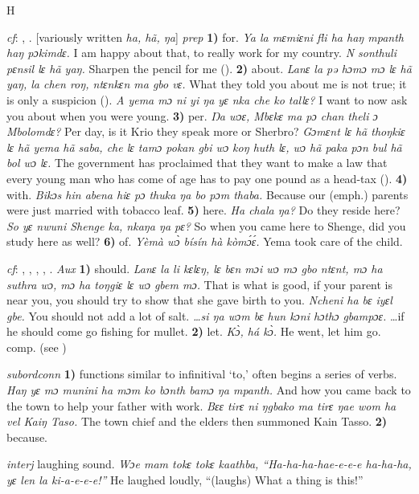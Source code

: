 \begin{letter}{H}

 \textit{cf}: , . [variously written \textit{ha, hã, ŋa}] \textit{prep} \textbf{1)} for. \textit{Ya la mɛmiɛni fli ha haŋ mpanth haŋ pɔkimdɛ.} I am happy about that, to really work for my country. \textit{N sonthuli pɛnsil lɛ hã yaŋ.} Sharpen the pencil for me (\citealt{Pichl1967}). \textbf{2)} about. \textit{Lanɛ la pə hɔmɔ mɔ lɛ hã yaŋ, la chen roŋ, ntɛnkɛn ma gbo vɛ.} What they told you about me is not true; it is only a suspicion (\citealt{Pichl1967}). \textit{A yema mɔ ni yi ŋa yɛ nka che ko tallɛ?} I want to now ask you about when you were young. \textbf{3)} per. \textit{Ŋa wɔɛ, Mbɛkɛ ma pɔ chan theli ɔ Mbolomdɛ?} Per day, is it Krio they speak more or Sherbro? \textit{Gɔmɛnt lɛ hã thoŋkiɛ lɛ hã yema hã saba, che lɛ tamɔ pokan gbi wɔ koŋ huth lɛ, wɔ hã paka pɔn bul hã bol wɔ lɛ.} The government has proclaimed that they want to make a law that every young man who has come of age has to pay one pound as a head-tax (\citealt{Pichl1967}). \textbf{4)} with. \textit{Bikɔs hin abena hiɛ pɔ thuka ŋa bo pɔm thaba.} Because our (emph.) parents were just married with tobacco leaf. \textbf{5)} here. \textit{Ha chala ŋa?} Do they reside here? \textit{So yɛ nwuni Shenge ka, nkaŋa ŋa pɛ?} So when you came here to Shenge, did you study here as well? \textbf{6)} of. \textit{Yèmà wɔ̀ bísín hà kòmɔ́ɛ́.} Yema took care of the child.

 \textit{cf}: , , , , . \textit{Aux} \textbf{1)} should. \textit{Lanɛ la li kɛlɛŋ, lɛ bɛn mɔi wɔ mɔ gbo ntɛnt, mɔ ha suthra wɔ, mɔ ha toŋgiɛ lɛ wɔ gbem mɔ.} That is what is good, if your parent is near you, you should try to show that she gave birth to you. \textit{Ncheni ha bɛ iyɛl gbe.} You should not add a lot of salt. \textit{…si ŋa wɔm bɛ hun kɔni hɔthɔ gbampɔɛ.} …if he should come go fishing for mullet. \textbf{2)} let. \textit{Kɔ̀, há kɔ̀.} He went, let him go. comp.  (see ) 

 \textit{subordconn} \textbf{1)} functions similar to infinitival ‘to,' often begins a series of verbs. \textit{Haŋ yɛ mɔ munini ha mɔm ko bɔnth bamɔ ŋa mpanth.} And how you came back to the town to help your father with work. \textit{Bɛɛ tirɛ ni ŋgbako ma tirɛ ŋae wom ha vel Kaiŋ Taso.} The town chief and the elders then summoned Kain Tasso. \textbf{2)} because.

 \textit{interj} laughing sound. \textit{Wɔe mam tokɛ tokɛ kaathba, “Ha-ha-ha-hae-e-e-e ha-ha-ha, yɛ len la ki-a-e-e-e!”} He laughed loudly, “(laughs) What a thing is this!”


\end{letter}
